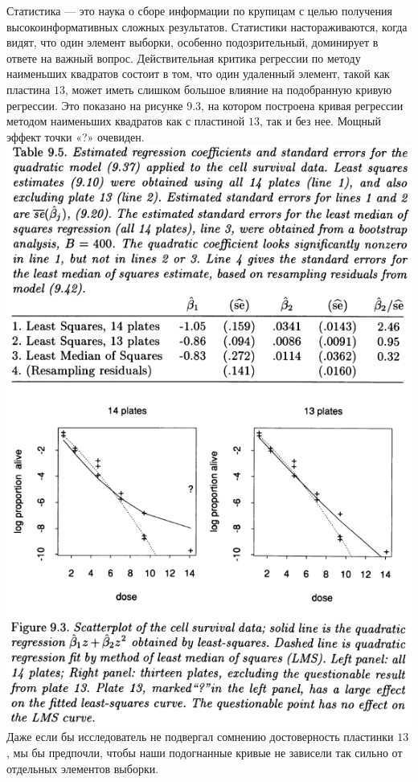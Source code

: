 Статистика --- это наука о сборе информации по крупицам с целью получения высокоинформативных сложных результатов. Статистики настораживаются, когда видят, что один элемент выборки, особенно подозрительный, доминирует в ответе на важный вопрос. Действительная критика регрессии по методу наименьших квадратов состоит в том, что один удаленный элемент, такой как пластина $13$, может иметь слишком большое влияние на подобранную кривую регрессии. Это показано на рисунке 9.3, на котором построена кривая регрессии методом наименьших квадратов как с пластиной $13$, так и без нее. Мощный эффект точки «?» очевиден.
\\[0.5cm] 
\noindent
\includegraphics[width=\linewidth]{9/t95f93}
\newpage
\noindent Даже если бы исследователь не подвергал сомнению достоверность пластинки $13$, мы бы предпочли, чтобы наши подогнанные кривые не зависели так сильно от отдельных элементов выборки.